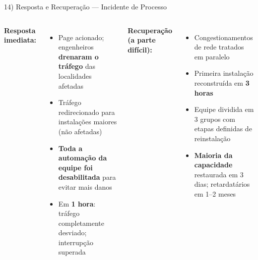 \documentclass[aspectratio=169]{beamer}
\begin{document}
\begin{frame}{14) Resposta e Recuperação — Incidente de Processo}

  \begin{columns}[T]
     \small
      \textbf{Resposta imediata:}
      \begin{itemize}
        \item Page acionado; engenheiros \textbf{drenaram o tráfego} das localidades afetadas
        \item Tráfego redirecionado para instalações maiores (não afetadas)
        \item \textbf{Toda a automação da equipe foi desabilitada} para evitar mais danos
        \item Em \textbf{1 hora}: tráfego completamente desviado; interrupção superada
      \end{itemize}
      \vspace{0.3em}
      \textbf{Recuperação (a parte difícil):}
      \begin{itemize}
        \item Congestionamentos de rede tratados em paralelo
        \item Primeira instalação reconstruída em \textbf{3 horas}
        \item Equipe dividida em 3 grupos com etapas definidas de reinstalação
        \item \textbf{Maioria da capacidade} restaurada em 3 dias; retardatários em 1–2 meses
      \end{itemize}

      \centering
\end{columns}
\end{frame}
\end{document}
